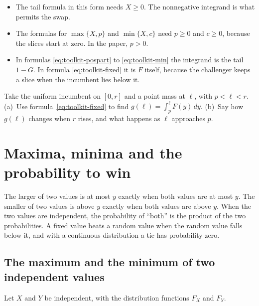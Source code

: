 \begin{watchout}
\begin{itemize}
\item The tail formula in this form needs \(X\ge0\). The nonnegative integrand is what permits the swap.
\item The formulas for \(\max\{X,p\}\) and \(\min\{X,c\}\) need \(p\ge0\) and \(c\ge0\), because the slices start at
zero. In the paper, \(p>0\).
\item In formulas \eqref{eq:toolkit-pospart} to \eqref{eq:toolkit-min} the integrand is the tail \(1-G\). In
formula \eqref{eq:toolkit-fixed} it is \(F\) itself, because the challenger keeps a slice when the incumbent lies
below it.
\end{itemize}
\end{watchout}

\begin{checkyourself}\label{q:toolkit-tail}
Take the uniform incumbent on \([0,r]\) and a point mass at \(\ell\), with \(p<\ell<r\).
(a)~Use formula~\eqref{eq:toolkit-fixed} to find \(g(\ell)=\int_p^\ell F(y)\,dy\).
(b)~Say how \(g(\ell)\) changes when \(r\) rises, and what happens as \(\ell\) approaches \(p\).
\end{checkyourself}

\section{Maxima, minima and the probability to win}\label{sec:toolkit-maxmin}

\begin{intuition}
The larger of two values is at most \(y\) exactly when both values are at most \(y\). The smaller of two values is
above \(y\) exactly when both values are above \(y\). When the two values are independent, the probability of
``both'' is the product of the two probabilities. A fixed value beats a random value when the random value falls
below it, and with a continuous distribution a tie has probability zero.
\end{intuition}

\subsection{The maximum and the minimum of two independent values}

Let \(X\) and \(Y\) be independent, with the distribution functions \(F_X\) and \(F_Y\).

